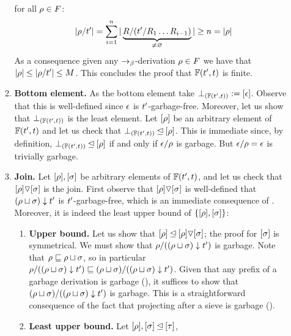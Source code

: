\begin{enumerate}
\begin{enumerate}
    for all $\rho \in F$:
    \[
      |\rho/t'| = \sum_{i=1}^{n} |\underbrace{R/(t'/R_1\hdots R_{i-1})}_{\neq \varnothing}| \geq n = |\rho|
    \]
    As a consequence given any $\mathrel{\to_\beta}$-derivation $\rho \in F$ we have that $|\rho| \leq |\rho/t'| \leq M$.
    This concludes the proof that $\mathbb{F}(t', t)$ is finite.
  \item {\bf Bottom element.}
    As the bottom element take $\bot_{(\mathbb{F}(t', t))} := {[\epsilon]}$.
    Observe that this is well-defined since $\epsilon$ is $t'$-garbage-free.
    Moreover, let us show that $\bot_{(\mathbb{F}(t', t))}$ is the least element.
    Let $[\rho]$ be an arbitrary element of $\mathbb{F}(t', t)$
    and let us check that $\bot_{(\mathbb{F}(t', t))} \unlhd [\rho]$.
    This is immediate since,
    by definition, $\bot_{(\mathbb{F}(t', t))} \unlhd [\rho]$
    if and only if $\epsilon/\rho$ is garbage.
    But $\epsilon/\rho = \epsilon$ is trivially garbage.
  \item {\bf Join.}
    Let $[\rho],[\sigma]$ be arbitrary elements of $\mathbb{F}(t', t)$,
    and let us check that $[\rho] \triangledown [\sigma]$ is the join.
    First observe that $[\rho] \triangledown [\sigma]$ is well-defined
    \ie that $(\rho \sqcup \sigma) \downarrow t'$ is $t'$-garbage-free,
    which is an immediate consequence of .
    Moreover, it is indeed the least upper bound of $\{[\rho],[\sigma]\}$:
    \begin{enumerate}
    \item {\bf Upper bound.}
      Let us show that $[\rho] \unlhd [\rho] \triangledown [\sigma]$; the proof for $[\sigma]$ is symmetrical.
      We must show that $\rho/((\rho \sqcup \sigma) \downarrow t')$ is garbage.
      Note that $\rho \sqsubseteq \rho \sqcup \sigma$,
      so in particular $\rho/((\rho \sqcup \sigma) \downarrow t') \sqsubseteq (\rho \sqcup \sigma)/((\rho \sqcup \sigma) \downarrow t')$.
      Given that any prefix of a garbage derivation is garbage (),
      it suffices to show that $(\rho \sqcup \sigma)/((\rho \sqcup \sigma) \downarrow t')$ is garbage.
      This is a straightforward consequence of the fact that projecting after a sieve is garbage ().
    \item {\bf Least upper bound.}
      Let $[\rho], [\sigma] \unlhd [\tau]$,

\end{enumerate}
\end{enumerate}
\end{enumerate}
